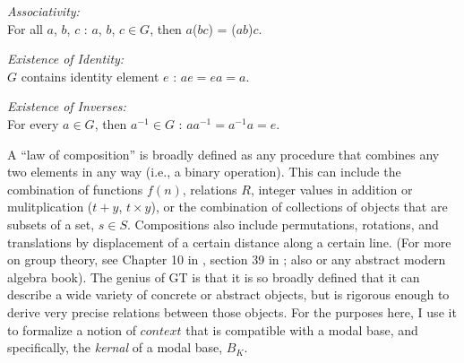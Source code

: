 \documentclass[11pt]{article}
\begin{document}
\begin{criterion}
\textsl{Associativity:}\\ For all $a$, $b$, $c$ : $a$, $b$, $c \in G$, then $a$($bc$) = ($ab$)$c$.
\end{criterion}

\begin{criterion}
\textsl{Existence of Identity:}\\ $G$ contains identity element $e$ : $ae = ea = a$.
\end{criterion}

\begin{criterion}
\textsl{Existence of Inverses:}\\ For every $a \in G$, then $a^{-1} \in G$ : $aa^{-1} = a^{-1}a = e$.
\end{criterion}

A ``law of composition'' is broadly defined as any procedure that combines any two elements in any way (i.e., a binary operation). This can include the combination of functions $f(n)$,  relations $R$, integer values in addition or mulitplication ($t + y$, $t \times y$), or the combination of collections of objects that are subsets of a set, $s \in S$. Compositions also include permutations, rotations, and translations by displacement of a certain distance along a certain line. (For more on group theory, see Chapter 10 in \cite{pmw:1990}, section 39 in \cite{kleene:1967}; also \cite{dornhoffhohn:1978} or any abstract modern algebra book). The genius of GT is that it is so broadly defined that it can describe a wide variety of concrete or abstract objects, but is rigorous enough to derive very precise relations between those objects. For the purposes here, I use it to formalize a notion of $context$ that is compatible with a modal base, and specifically, the \textsl{kernal} of a modal base, $B_{K}$.

% 
%  
% 

\end{document}
